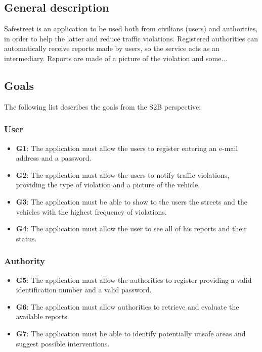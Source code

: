 \documentclass[12pt,a4paper]{report}
\begin{document}
	\subsection{General description}
Safestreet is an application to be used both from civilians (users) and authorities, in order to help the latter and reduce traffic violations. Registered authorities can automatically receive reports made by users, so the service acts as an intermediary. Reports are made of a picture of the violation and some... 
	\subsection{Goals}
	The following list describes the goals from the S2B perspective:
		\subsubsection{User}
	\begin{itemize}
		\item \textbf{G1}: The application must allow the users to register entering an e-mail address and a password.
		\item \textbf{G2}: The application must allow the users to notify traffic violations, providing  the type of violation and a picture of the vehicle.
		\item \textbf{G3}: The application must be able to show to the users the streets and the vehicles with the highest frequency of violations.

		\item \textbf{G4}: The application must allow the user to see all of his reports and their status.
	\end{itemize}
		\subsubsection{Authority}
	\begin{itemize}
		\item \textbf{G5}: The application must allow the authorities to register providing a valid identification number and a valid password.
	  	\item \textbf{G6}: The application must allow authorities to retrieve and evaluate the available reports.
		\item \textbf{G7}: The application must be able to identify potentially unsafe areas and suggest possible interventions.
	\end{itemize}
	
\end{document}
